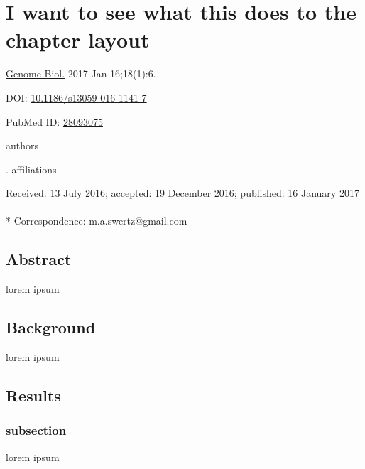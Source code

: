 \chapter[This is an example chapter]{I want to see what this does to the chapter layout}
\label{chap:example}

{ \Large {} }

\hfill \underline{Genome Biol.} 2017 Jan 16;18(1):6.

\hfill DOI: \href{https://doi.org/10.1186/s13059-016-1141-7}{10.1186/s13059-016-1141-7}

\hfill PubMed ID: \href{https://www.ncbi.nlm.nih.gov/pubmed/28093075}{28093075}

\newpage

\noindent
authors

. affiliations

\noindent
Received: 13 July 2016; accepted: 19 December 2016; published: 16 January 2017
\\~\\
* Correspondence: m.a.swertz@gmail.com

\section*{Abstract}

lorem ipsum

\section{Background}

lorem ipsum


\section{Results}

\subsection{subsection}
lorem ipsum



